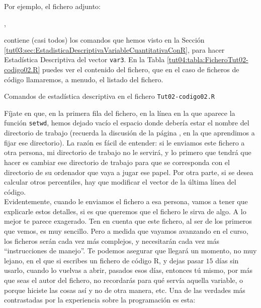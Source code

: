 \documentclass[10pt,a4paper]{article}\usepackage[]{graphicx}\usepackage[]{color}
\newcounter {cont01}
\begin{document}
Por ejemplo, el fichero adjunto:
\begin{center}
  ,
\end{center}
contiene (casi todos) los comandos que hemos visto en la Sección \ref{tut03:sec:EstadisticaDescriptivaVariableCuantitativaConR}, para hacer Estadística Descriptiva del vector {\tt var3}. En la Tabla \ref{tut04:tabla:FicheroTut02-codigo02.R} puedes ver el contenido del fichero, que en el caso de ficheros de código llamaremos, a menudo, el {\sf listado del fichero}.

\begin{table}[h!]

\caption{Comandos de estadística descriptiva en el fichero {\tt Tut02-codigo02.R}}
\label{tut04:tabla:FicheroTut02-codigo02.R}
\end{table}

Fíjate en que, en la primera fila del fichero, en la línea en la que aparece la función {\tt setwd}, hemos dejado vacío el espacio donde debería estar el nombre del directorio de trabajo (recuerda la discusión de la página \pageref{tut02:lugar:ComandoSetwd}, en la que aprendimos a fijar ese directorio). La razón es fácil de entender: si le enviamos este fichero a otra persona, mi directorio de trabajo no le servirá, y lo primero que tendrá que hacer es cambiar ese directorio de trabajo para que se corresponda con el directorio de su ordenador que vaya a jugar ese papel. Por otra parte, si se desea calcular otros percentiles, hay que modificar el vector de la última línea del código.\\

Evidentemente,  cuando le enviamos el fichero a esa persona, vamos a tener que explicarle estos detalles, si es que queremos que el fichero le sirva de algo. A lo mejor te parece exagerado. Ten en cuenta que este fichero, al ser de los primeros que vemos, es muy sencillo.  Pero a medida que vayamos avanzando en el curso, los ficheros serán cada vez más complejos, y necesitarán cada vez más {``instrucciones de manejo''}. Te podemos asegurar que llegará un momento, no muy lejano, en el que si escribes un fichero de código R, y dejas pasar $15$ días sin usarlo,  cuando lo vuelvas a abrir, pasados esos días, entonces tú mismo, por más que seas el autor del fichero, no recordarás para qué servía aquella variable, o porque hiciste las cosas así y no de otra manera, etc. Una de las verdades más contrastadas por la experiencia sobre la programación es esta:
\end{document}
